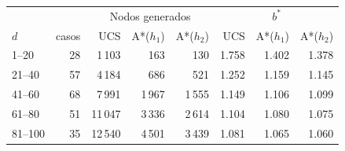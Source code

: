 \begin{tabular}{lr|rrr|rrr}
\hline
 & & \multicolumn{3}{c|}{Nodos generados} & \multicolumn{3}{c}{$b^*$} \\
$d$ & casos & UCS & A*($h_1$) & A*($h_2$) & UCS & A*($h_1$) & A*($h_2$) \\
\hline
1--20 & 28 & 1\,103 & 163 & 130 & 1.758 & 1.402 & 1.378 \\
21--40 & 57 & 4\,184 & 686 & 521 & 1.252 & 1.159 & 1.145 \\
41--60 & 68 & 7\,991 & 1\,967 & 1\,555 & 1.149 & 1.106 & 1.099 \\
61--80 & 51 & 11\,047 & 3\,336 & 2\,614 & 1.104 & 1.080 & 1.075 \\
81--100 & 35 & 12\,540 & 4\,501 & 3\,439 & 1.081 & 1.065 & 1.060 \\
\hline
\end{tabular}
